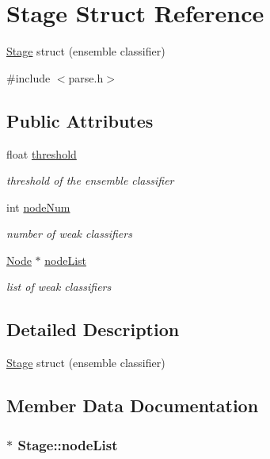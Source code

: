 \hypertarget{structStage}{}\section{Stage Struct Reference}
\label{structStage}


\hyperlink{structStage}{Stage} struct (ensemble classifier)  




{\ttfamily \#include $<$parse.\+h$>$}

\subsection*{Public Attributes}
\begin{DoxyCompactItemize}
\item 
float \hyperlink{structStage_ac3a6bd092f13376a27af866314a4d3a6}{threshold}
\begin{DoxyCompactList}\small\item\em threshold of the ensemble classifier \end{DoxyCompactList}\item 
int \hyperlink{structStage_a350f9d0cf41551e1ec0f8387a44f7eb8}{node\+Num}
\begin{DoxyCompactList}\small\item\em number of weak classifiers \end{DoxyCompactList}\item 
\hyperlink{structNode}{Node} $\ast$ \hyperlink{structStage_af85d94345320d7ff990f524e45626622}{node\+List}
\begin{DoxyCompactList}\small\item\em list of weak classifiers \end{DoxyCompactList}\end{DoxyCompactItemize}


\subsection{Detailed Description}
\hyperlink{structStage}{Stage} struct (ensemble classifier) 

\subsection{Member Data Documentation}
\hypertarget{structStage_af85d94345320d7ff990f524e45626622}{}
\subsubsection[{node\+List}]{$\ast$ Stage\+::node\+List}\label{structStage_af85d94345320d7ff990f524e45626622}


